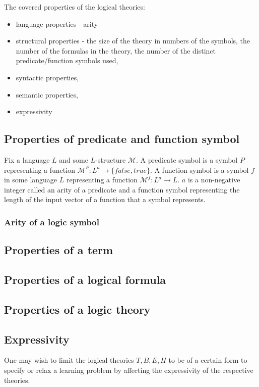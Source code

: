The covered properties of the logical theories:
\begin{itemize}
\item language properties - arity
\item structural properties - the size of the theory in numbers of the symbols, the number of the formulas in the theory, the number of the distinct predicate/function symbols used, 
\item syntactic properties,
\item semantic properties,
\item expressivity
\end{itemize}

\subsection{Properties of predicate and function symbol}

Fix a language $L$ and some $L$-structure $\mathcal{M}$.
A predicate symbol is a symbol $P$ representing a function $\mathcal{M}^P:L^{a} \to \{false, true\}$. A function symbol is a symbol $f$ in some language $L$ representing a function $\mathcal{M}^f:L^a \to L$. $a$ is a non-negative integer called an arity of a predicate and a function symbol representing the length of the input vector of a function that a symbol represents.

\subsubsection{Arity of a logic symbol}


\subsection{Properties of a term}


\subsection{Properties of a logical formula}

\subsection{Properties of a logic theory}

\subsection{Expressivity}
One may wish to limit the logical theories $T, B, E, H$ to be of a certain form to specify or relax a learning problem by affecting the expressivity of the respective theories.

